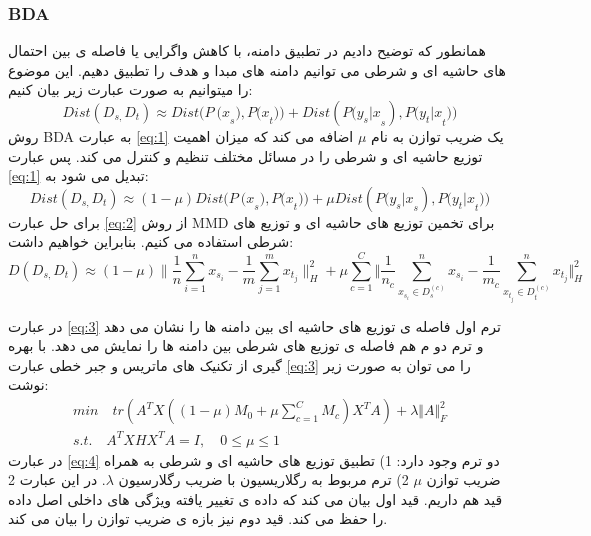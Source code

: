 {{	 	\subsubsection{BDA}
	 	{
 		همانطور که توضیح دادیم در تطبیق دامنه، با کاهش واگرایی یا فاصله ی بین احتمال های حاشیه ای و شرطی می توانیم دامنه های مبدا و هدف را تطبیق دهیم. این موضوع را میتوانیم به صورت عبارت زیر بیان کنیم:
 		\begin{equation}
 			Dist\left(D_{s,}D_t\right)\approx Dist{(P\ (x}_s),{P(x}_t))+Dist({P(y_s|x}_s),{P(y_t|x}_t))
 			\label{eq:1}
 		\end{equation}
 		روش BDA به عبارت 
 		\ref{eq:1}
 		 یک ضریب توازن به نام $\mu$ اضافه می کند که میزان اهمیت توزیع حاشیه ای و شرطی را در مسائل مختلف تنظیم و کنترل می کند. پس عبارت 
 		\ref{eq:1}
 		 تبدیل می شود به:
 		 \begin{equation}
 			Dist\left(D_{s,}D_t\right)\approx(1-\mu)Dist{(P\ (x}_s),{P(x}_t))+\mu Dist({P(y_s|x}_s),{P(y_t|x}_t))
 			\label{eq:2}
 		 \end{equation}
 		  برای حل عبارت 
 		  \ref{eq:2}
 		  از روش MMD برای تخمین توزیع های حاشیه ای و توزیع های شرطی استفاده می کنیم. بنابراین خواهیم داشت:
 		  \begin{equation}
 		  	 D \left( D_{s,}D_{t} \right)  \approx  \left( 1- \mu  \right)  \bigg \|\frac{1}{n} \sum _{i=1}^{n}x_{s_{i}} - \frac{1}{m} \sum _{j=1}^{m}x_{t_{j}}\bigg \| _{H}^{2} + \mu \sum _{c=1}^{C} \bigg \Vert \frac{1}{n_{c}} \sum _{x_{s_{i}} \in  D_{s}^{ \left( c \right) }}^{n}x_{s_{i}} - \frac{1}{m_{c}} \sum _{x_{t_{j}} \in  D_{t}^{ \left( c \right) }}^{n}x_{t_{j}} \bigg \Vert _{H}^{2}
 		  	 \label{eq:3}
 		  \end{equation}
 		  
 		  در عبارت 
 		 \ref{eq:3}
 		  ترم اول فاصله ی توزیع های حاشیه ای بین دامنه ها را نشان می دهد و ترم دو م هم  فاصله ی توزیع های شرطی بین دامنه ها را نمایش می دهد. با بهره گیری از تکنیک های ماتریس و جبر خطی عبارت 
 		 \ref{eq:3}
 		  را می توان به صورت زیر نوشت:
 		  \begin{equation}
	 	  \begin{aligned}
		  min \quad tr \left( A^{T}X \left( \left( 1 - \mu \right) M_{0} + \mu \sum _{c=1\mathrm{ }}^{C}M_{c} \right) X^{T}A \right) + \lambda \Vert A \Vert_{F}^{2} \\
		  s.t. \quad A^{T}XHX^{T}A = I, \quad  0  \leq \mu \leq  1 \quad \quad \quad \quad \quad
		  \label{eq:4}
	 	  \end{aligned}
 		  \end{equation}
 		   در عبارت
 		   \ref{eq:4}
 		    دو ترم وجود دارد: 1) تطبیق توزیع های حاشیه ای و شرطی به همراه ضریب توازن $\mu$ 2) ترم مربوط به رگلاریسیون با ضریب رگلارسیون $\lambda$. در این عبارت 2 قید هم داریم. قید اول بیان می کند که داده ی تغییر یافته ویژگی های داخلی اصل داده را حفظ می کند. قید دوم نیز بازه ی ضریب توازن را بیان می کند.
 		    
}}}
